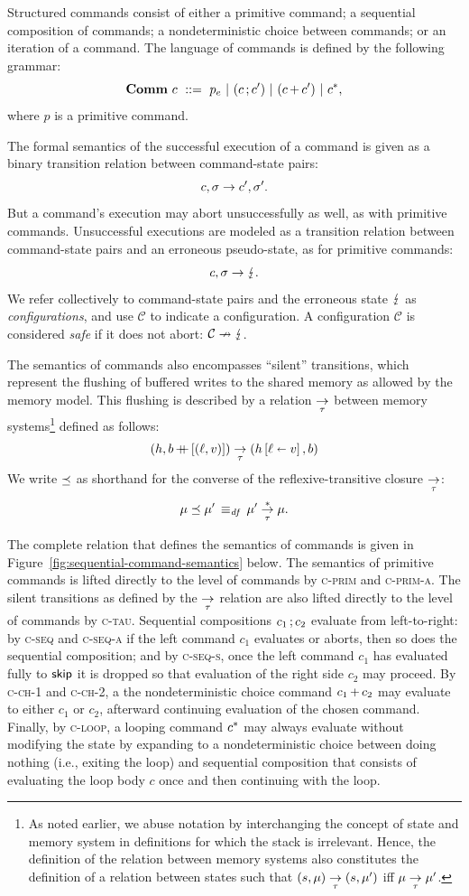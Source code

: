 \documentclass[11pt]{report}
\begin{document}
Structured commands consist of either a primitive command; a sequential composition of commands; a nondeterministic choice between commands; or an iteration of a command. The language of commands is defined by the following grammar: \[ \mathbf{Comm}~c ~::=~ p_e ~|~ (c \operatorname{;} c') ~|~ (c \operatorname{+} c') ~|~ c^{\operatorname{\ast}},\] where $p$ is a primitive command.  

The formal semantics of the successful execution of a command is given as a binary transition relation between command-state pairs: \[ c,\sigma \rightarrow c',\sigma'.\] But a command's execution may abort unsuccessfully as well, as with primitive commands. Unsuccessful executions are modeled as a transition relation between command-state pairs and an erroneous pseudo-state, as for primitive commands: \[ c,\sigma \rightarrow \lightning. \] We refer collectively to command-state pairs and the erroneous state $\lightning$ as \emph{configurations}, and use $\mathcal{C}$ to indicate a configuration. A configuration $\mathcal{C}$ is considered \emph{safe} if it does not abort: $\mathcal{C} \nrightarrow \lightning$.

The semantics of commands also encompasses ``silent'' transitions, which represent the flushing of buffered writes to the shared memory as allowed by the memory model. This flushing is described by a relation $\underset{\tau}{\rightarrow}$ between memory systems\footnote{As noted earlier, we abuse notation by interchanging the concept of state and memory system in definitions for which the stack is irrelevant. Hence, the definition of the relation between memory systems  also constitutes the definition of a relation between states such that $(s,\mu) \underset{\tau}{\rightarrow} (s,\mu')$ iff $\mu \underset{\tau}{\rightarrow} \mu'$.} defined as follows: \begin{align*} (h,b \operatorname{+\!\!\!+} \left[(\ell,v)\right]) \underset{\tau}{\rightarrow} (h \left[ \ell \shortleftarrow v \right],b) 
\end{align*} We write $\preceq$ as shorthand for the converse of the reflexive-transitive closure $\underset{\tau}{\rightarrow}$: \[ \mu \preceq \mu' \operatorname{\;\equiv_{\mathit{df}}\;} \mu' \overset{\ast}{\underset{\tau}{\rightarrow}} \mu.\] 

The complete relation that defines the semantics of commands is given in Figure~\ref{fig:sequential-command-semantics} below. The semantics of primitive commands is lifted directly to the level of commands by \textsc{c-prim} and \textsc{c-prim-a}. The silent transitions as defined by the $\underset{\tau}{\rightarrow}$ relation are also lifted directly to the level of commands by \textsc{c-tau}. Sequential compositions $c_1 \operatorname{;} c_2$ evaluate from left-to-right: by \textsc{c-seq} and \textsc{c-seq-a} if the left command $c_1$ evaluates or aborts, then so does the sequential composition; and by \textsc{c-seq-s}, once the left command $c_1$ has evaluated fully to $\operatorname{\mathsf{skip}}$ it is dropped so that evaluation of the right side $c_2$ may proceed. By \textsc{c-ch-1} and \textsc{c-ch-2}, a the nondeterministic choice command $c_1 \operatorname{+} c_2$ may evaluate to either $c_1$ or $c_2$, afterward continuing evaluation of the chosen command. Finally, by \textsc{c-loop}, a looping command $c^{\operatorname{\ast}}$ may always evaluate without modifying the state by expanding to a nondeterministic choice between doing nothing (i.e., exiting the loop) and sequential composition that consists of evaluating the loop body $c$ once and then continuing with the loop. 
\end{document}
